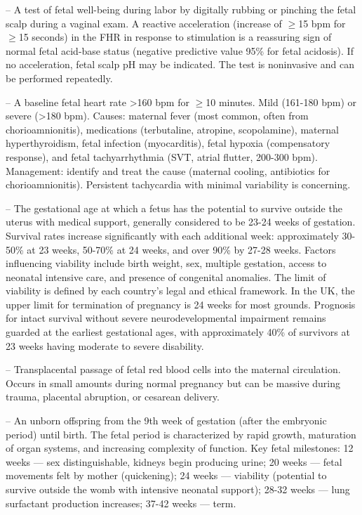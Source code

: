 -- A test of fetal well-being during labor by digitally rubbing or pinching the fetal scalp during a vaginal exam. A reactive acceleration (increase of \(\ge\)15 bpm for \(\ge\)15 seconds) in the FHR in response to stimulation is a reassuring sign of normal fetal acid-base status (negative predictive value 95\% for fetal acidosis). If no acceleration, fetal scalp pH may be indicated. The test is noninvasive and can be performed repeatedly.

-- A baseline fetal heart rate >160 bpm for \(\ge\)10 minutes. Mild (161-180 bpm) or severe (>180 bpm). Causes: maternal fever (most common, often from chorioamnionitis), medications (terbutaline, atropine, scopolamine), maternal hyperthyroidism, fetal infection (myocarditis), fetal hypoxia (compensatory response), and fetal tachyarrhythmia (SVT, atrial flutter, 200-300 bpm). Management: identify and treat the cause (maternal cooling, antibiotics for chorioamnionitis). Persistent tachycardia with minimal variability is concerning.

-- The gestational age at which a fetus has the potential to survive outside the uterus with medical support, generally considered to be 23-24 weeks of gestation. Survival rates increase significantly with each additional week: approximately 30-50\% at 23 weeks, 50-70\% at 24 weeks, and over 90\% by 27-28 weeks. Factors influencing viability include birth weight, sex, multiple gestation, access to neonatal intensive care, and presence of congenital anomalies. The limit of viability is defined by each country's legal and ethical framework. In the UK, the upper limit for termination of pregnancy is 24 weeks for most grounds. Prognosis for intact survival without severe neurodevelopmental impairment remains guarded at the earliest gestational ages, with approximately 40\% of survivors at 23 weeks having moderate to severe disability.

-- Transplacental passage of fetal red blood cells into the maternal circulation. Occurs in small amounts during normal pregnancy but can be massive during trauma, placental abruption, or cesarean delivery.

-- An unborn offspring from the 9th week of gestation (after the embryonic period) until birth. The fetal period is characterized by rapid growth, maturation of organ systems, and increasing complexity of function. Key fetal milestones: 12 weeks — sex distinguishable, kidneys begin producing urine; 20 weeks — fetal movements felt by mother (quickening); 24 weeks — viability (potential to survive outside the womb with intensive neonatal support); 28-32 weeks — lung surfactant production increases; 37-42 weeks — term.

